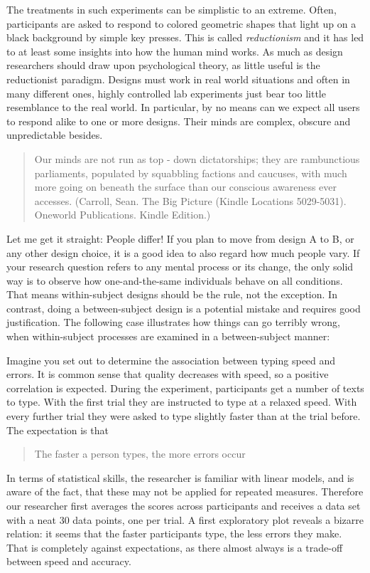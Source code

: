 \documentclass[]{svmono}
\begin{document}
The treatments in such experiments can be simplistic to an extreme.
Often, participants are asked to respond to colored geometric shapes
that light up on a black background by simple key presses. This is
called \emph{reductionism} and it has led to at least some insights into
how the human mind works. As much as design researchers should draw upon
psychological theory, as little useful is the reductionist paradigm.
Designs must work in real world situations and often in many different
ones, highly controlled lab experiments just bear too little resemblance
to the real world. In particular, by no means can we expect all users to
respond alike to one or more designs. Their minds are complex, obscure
and unpredictable besides.

\begin{quote}
Our minds are not run as top - down dictatorships; they are rambunctious
parliaments, populated by squabbling factions and caucuses, with much
more going on beneath the surface than our conscious awareness ever
accesses. (Carroll, Sean. The Big Picture (Kindle Locations 5029-5031).
Oneworld Publications. Kindle Edition.)
\end{quote}

Let me get it straight: People differ! If you plan to move from design A
to B, or any other design choice, it is a good idea to also regard how
much people vary. If your research question refers to any mental process
or its change, the only solid way is to observe how one-and-the-same
individuals behave on all conditions. That means within-subject designs
should be the rule, not the exception. In contrast, doing a
between-subject design is a potential mistake and requires good
justification. The following case illustrates how things can go terribly
wrong, when within-subject processes are examined in a between-subject
manner:

Imagine you set out to determine the association between typing speed
and errors. It is common sense that quality decreases with speed, so a
positive correlation is expected. During the experiment, participants
get a number of texts to type. With the first trial they are instructed
to type at a relaxed speed. With every further trial they were asked to
type slightly faster than at the trial before. The expectation is that

\begin{quote}
The faster a person types, the more errors occur
\end{quote}

In terms of statistical skills, the researcher is familiar with linear
models, and is aware of the fact, that these may not be applied for
repeated measures. Therefore our researcher first averages the scores
across participants and receives a data set with a neat 30 data points,
one per trial. A first exploratory plot reveals a bizarre relation: it
seems that the faster participants type, the less errors they make. That
is completely against expectations, as there almost always is a
trade-off between speed and accuracy.
\end{document}
